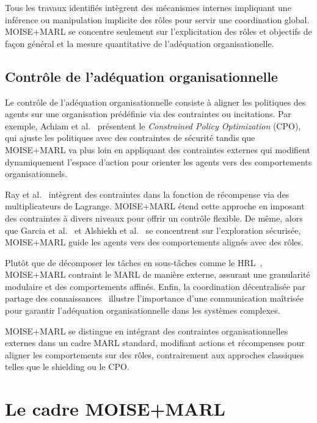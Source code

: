 \documentclass[dissemination]{jfsma}
\begin{document}
Tous les travaux identifiés intègrent des mécanismes internes impliquant une inférence  ou manipulation implicite des rôles pour servir une coordination global. MOISE+MARL se concentre seulement sur l'explicitation des rôles et objectifs de façon général et la mesure quantitative de l'adéquation organisationelle.

\subsection{Contrôle de l'adéquation organisationnelle}

Le contrôle de l'adéquation organisationnelle consiste à aligner les politiques des agents sur une organisation prédéfinie via des contraintes ou incitations. Par exemple, Achiam et al.~\cite{achiam2017cpo} présentent le \textit{Constrained Policy Optimization} (CPO), qui ajuste les politiques avec des contraintes de sécurité tandis que MOISE+MARL va plus loin en appliquant des contraintes externes qui modifient dynamiquement l'espace d'action pour orienter les agents vers des comportements organisationnels.

Ray et al.~\cite{ray2019benchmarking} intègrent des contraintes dans la fonction de récompense via des multiplicateurs de Lagrange. MOISE+MARL étend cette approche en imposant des contraintes à divers niveaux pour offrir un contrôle flexible. De même, alors que Garcia et al.~\cite{garcia2015comprehensive} et Alshiekh et al.~\cite{alshiekh2018safe} se concentrent sur l'exploration sécurisée, MOISE+MARL guide les agents vers des comportements alignés avec des rôles.

Plutôt que de décomposer les tâches en sous-tâches comme le HRL~\cite{ghavamzadeh2006hrl}, MOISE+MARL contraint le MARL de manière externe, assurant une granularité modulaire et des comportements affinés. Enfin, la coordination décentralisée par partage des connaissances~\cite{foerster2018communication} illustre l'importance d'une communication maîtrisée pour garantir l'adéquation organisationnelle dans les systèmes complexes.

MOISE+MARL se distingue en intégrant des contraintes organisationnelles externes dans un cadre MARL standard, modifiant actions et récompenses pour aligner les comportements sur des rôles, contrairement aux approches classiques telles que le shielding ou le CPO.


\section{Le cadre MOISE+MARL}
\label{sec:moise_marl_framework}
\end{document}
